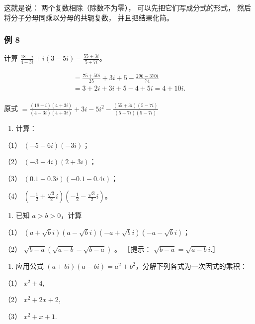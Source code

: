 这就是说： 两个复数相除（除数不为零）， 可以先把它们写成分式的形式，
然后将分子分母同乘以分母的共轭复数， 并且把结果化简。

\subsubsection{例 8}

计算 \(\frac{18 - i}{4 - 3i} + i(3 - 5i) - \frac{55 + 3i}{5 + 7i}\)。


\[
\begin{array}{l} = \frac {75 + 50 i}{25} + 3 i + 5 - \frac {296 - 370 i}{74} \\ = 3 + 2 i + 3 i + 5 - 4 + 5 i = 4 + 10 i. \\ \end{array}
\]

原式
\(= \frac{(18 - i)(4 + 3i)}{(4 - 3i)(4 + 3i)} +3i - 5i^2 -\frac{(55 + 3i)(5 - 7i)}{(5 + 7i)(5 - 7i)}\)

\begin{enumerate}
\item
  计算：
\end{enumerate}

（1） \((-5 + 6i)(-3i)\)；

（2） \((-3 - 4i)(2 + 3i)\)；

（3） \((0.1 + 0.3i)(-0.1 - 0.4i)\)；

（4）
\(\left(-\frac{1}{2} + \frac{\sqrt{3}}{2} i\right)\left(-\frac{1}{2} - \frac{\sqrt{3}}{2} i\right)\)。

\begin{enumerate}[start=2]
\item
  已知 \(a > b > 0\)，计算
\end{enumerate}

（1）
\((a + \sqrt{b} i)(a - \sqrt{b} i)(-a + \sqrt{b} i)(-a - \sqrt{b} i)\)；

（2） \(\sqrt{b - a} (\sqrt{a - b} -\sqrt{b - a})\) 。 ［提示：
\(\sqrt{b - a} = \sqrt{a - b} i.\)］

\begin{enumerate}[start=3]
\item
  应用公式
  \((a + bi)(a - bi) = a^2 + b^2\)，分解下列各式为一次因式的乘积：
\end{enumerate}

（1） \(x^{2} + 4,\)

（2） \(x^{2} + 2x + 2,\)

（3） \(x^{2} + x + 1.\)

